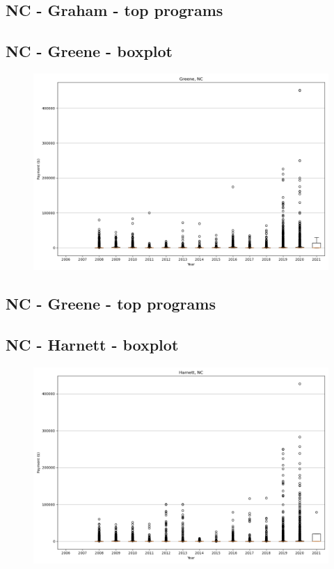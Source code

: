 \subsection*{NC - Graham - top programs}

\newpage
\subsection*{NC - Greene - boxplot}
\begin{figure}[h]
\centering
\includegraphics[width=7in]{../output/boxplots/counties/Greene-NC_boxplot.png}
\end{figure}


\subsection*{NC - Greene - top programs}

\newpage
\subsection*{NC - Harnett - boxplot}
\begin{figure}[h]
\centering
\includegraphics[width=7in]{../output/boxplots/counties/Harnett-NC_boxplot.png}
\end{figure}


